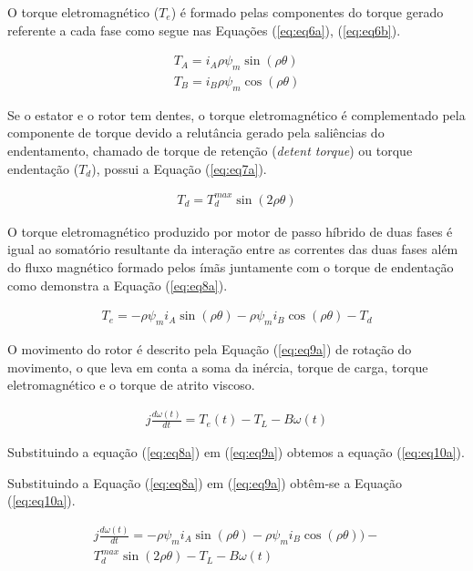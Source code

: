 O torque eletromagnético ($T_e$) é formado pelas componentes do torque gerado referente a cada fase como segue nas Equações (\ref{eq:eq6a}), (\ref{eq:eq6b}).

\begin{eqnarray}
\label{eq:eq6a}
T_A = i_A \rho \psi_m \sin(\rho \theta)\\
\label{eq:eq6b}
T_B = i_B \rho \psi_m \cos(\rho \theta) 
\end{eqnarray}

Se o estator e o rotor tem dentes, o torque eletromagnético é complementado pela componente de torque devido a relutância gerado pela saliências do endentamento, chamado de torque de retenção (\textit{detent torque}) ou torque endentação ($T_d$), possui a Equação (\ref{eq:eq7a}).

\begin{eqnarray}
\label{eq:eq7a}
T_d = T_{d}^{max}\sin(2 \rho \theta)
\end{eqnarray}

O torque eletromagnético produzido por motor de passo híbrido de duas fases é igual ao somatório resultante da interação entre as correntes das duas fases além do fluxo magnético formado pelos ímãs juntamente com o torque de endentação como demonstra a Equação (\ref{eq:eq8a}).

\begin{eqnarray}
	\label{eq:eq8a}
	T_e = - \rho \psi_m i_A \sin(\rho \theta) - \rho \psi_m i_B \cos(\rho \theta ) - T_d
\end{eqnarray}

O movimento do rotor é descrito pela Equação (\ref{eq:eq9a}) de rotação do movimento, o que leva em conta a soma da inércia, torque de carga, torque eletromagnético e o torque de atrito viscoso.

\begin{eqnarray}
\label{eq:eq9a}
j\frac{d\omega(t)}{dt} = T_e(t) - T_L - B\omega(t)
\end{eqnarray}

Substituindo a equação (\ref{eq:eq8a}) em (\ref{eq:eq9a}) obtemos a equação (\ref{eq:eq10a}).

\scriptsize
Substituindo a Equação (\ref{eq:eq8a}) em (\ref{eq:eq9a}) obtêm-se a Equação (\ref{eq:eq10a}).

\begin{eqnarray}
\label{eq:eq10a}
j\frac{d\omega(t)}{dt} = - \rho \psi_m i_A \sin(\rho \theta) - \rho \psi_m i_B \cos(\rho \theta ) )-\\ \nonumber T_{d}^{max}\sin(2 \rho \theta)  - T_L - B\omega(t)
\end{eqnarray}

